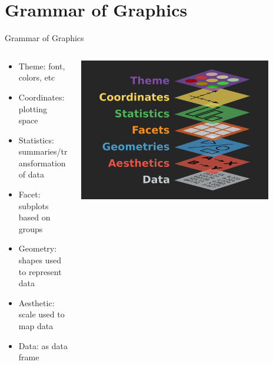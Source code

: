 \documentclass[aspectratio=169]{beamer}\usepackage[]{graphicx}\usepackage[]{color}
\begin{document}
\section{Grammar of Graphics}
\begin{frame}{Grammar of Graphics}
\begin{columns}
  \begin{column}{0.5\textwidth}
  \begin{itemize}
    \item Theme: font, colors, etc
    \item Coordinates: plotting space
    \item Statistics: summaries/transformation of data
    \item Facet: subplots based on groups
    \item Geometry: shapes used to represent data
    \item Aesthetic: scale used to map data
    \item Data: as data frame
  \end{itemize}
  \end{column}
  \begin{column}{0.5\textwidth}
  \begin{center}
      \includegraphics[width=0.85\textwidth]{./images/gglayers.png}
  \end{center}
  \end{column}
\end{columns}
\end{frame}
\end{document}

